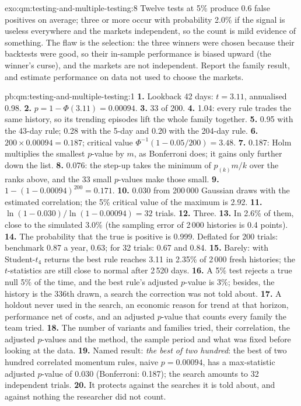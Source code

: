 \begin{solution}{exo:qm:testing-and-multiple-testing:8}
Twelve tests at 5\% produce 0.6 false positives on average; three or more occur with probability 2.0\% if the signal is useless
everywhere and the markets independent, so the count is mild evidence of something. The flaw is the selection: the three
winners were chosen because their backtests were good, so their in-sample performance is biased upward (the winner's curse),
and the markets are not independent. Report the family result, and estimate performance on data not used to choose the markets.
\end{solution}

\begin{solution}{pb:qm:testing-and-multiple-testing:1}
\textbf{1.} Lookback 42 days: $t = 3.11$, annualised  0.98.
\textbf{2.} $p = 1 - \Phi(3.11) = 0.00094$.
\textbf{3.} 33 of 200.
\textbf{4.} 1.04: every rule trades the same history, so its trending episodes lift the whole family together.
\textbf{5.} 0.95 with the 43-day rule; 0.28 with the 5-day and 0.20 with the 204-day rule.
\textbf{6.} $200 \times 0.00094 = 0.187$; critical value $\Phi^{-1}(1 - 0.05/200) = 3.48$.
\textbf{7.} 0.187: Holm multiplies the smallest $p$-value by $m$, as Bonferroni does; it gains only further down the list.
\textbf{8.} 0.076: the step-up takes the minimum of $p_{(k)}m/k$ over the ranks above, and the 33 small $p$-values make those small.
\textbf{9.} $1 - (1 - 0.00094)^{200} = 0.171$.
\textbf{10.} 0.030 from 200\,000 Gaussian draws with the estimated correlation; the 5\% critical value of the maximum is 2.92.
\textbf{11.} $\ln(1 - 0.030)/\ln(1 - 0.00094) = 32$ trials.
\textbf{12.} Three.
\textbf{13.} In 2.6\% of them, close to the simulated 3.0\% (the sampling error of 2\,000 histories is 0.4 points).
\textbf{14.} The probability that the true  is positive is 0.999. Deflated for 200 trials: benchmark 0.87 a year,  0.63; for 32 trials: 0.67 and 0.84.
\textbf{15.} Barely: with Student-$t_4$ returns the best rule reaches 3.11 in 2.35\% of 2\,000 fresh histories; the $t$-statistics are
still close to normal after 2\,520 days.
\textbf{16.} A 5\% test rejects a true null 5\% of the time, and the best rule's adjusted $p$-value is 3\%; besides, the history is the
336th drawn, a search the correction was not told about.
\textbf{17.} A holdout never used in the search, an economic reason for trend at that horizon, performance net of costs, and an
adjusted $p$-value that counts every family the team tried.
\textbf{18.} The number of variants and families tried, their correlation, the adjusted $p$-values and the method, the sample period and
what was fixed before looking at the data.
\textbf{19.} Named result: \emph{the best of two hundred}: the best of two hundred correlated momentum rules, naive $p = 0.00094$, has a
max-statistic adjusted $p$-value of 0.030 (Bonferroni: 0.187); the search amounts to 32 independent trials.
\textbf{20.} It protects against the searches it is told about, and against nothing the researcher did not count.
\end{solution}


